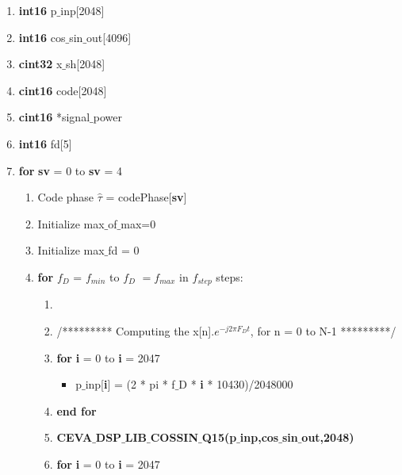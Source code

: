 \documentclass[journal,10pt,onecolumn]{article}
\begin{document}
\begin{enumerate}
    \item[] \textbf{int16} p$\_$inp[2048]
    \item[] \textbf{int16} cos$\_$sin$\_$out[4096]  
    \item[] \textbf{cint32} x$\_${sh}[2048]
    \item[] \textbf{cint16} code[2048]
    \item[] \textbf{cint16} *signal$\_$power
    \item[] \textbf{int16} fd[5]

    \item[]  \textbf{for} \textbf{sv} = 0  to \textbf{sv} = 4
    \begin{enumerate}
        \item[] Code phase $\hat{\tau}$ = codePhase[\textbf{sv}]
            \item[] Initialize max$\_$of$\_$max=0
            \item[] Initialize max$\_$fd    = 0

            \item[] \textbf{for} \textbf{$f_D$} = $f_{min}$ to \textbf{$f_D$} $= f_{max}$ in $f_{step}$ steps:
            \begin{enumerate}
                \item[]
                \item[]  /********* Computing the x[n].$e^{-j2 \pi F_Dt}$, for n = 0 to N-1 *********/
                \item[] \textbf{for} \textbf{i} = 0 to \textbf{i} = 2047
                \begin{itemize}
                    \item[] p$\_$inp[\textbf{i}] = (2 * pi * f$\_${D} * \textbf{i} * 10430)/2048000
                \end{itemize}
                \item[] \textbf{end for}
                \item[] \textbf{CEVA$\_$DSP$\_$LIB$\_$COSSIN$\_$Q15(p$\_$inp,cos$\_$sin$\_$out,2048)}
                \item[] \textbf{for} \textbf{i} = 0 to \textbf{i} = 2047
                

\end{enumerate}
\end{enumerate}
\end{enumerate}
\end{document}
